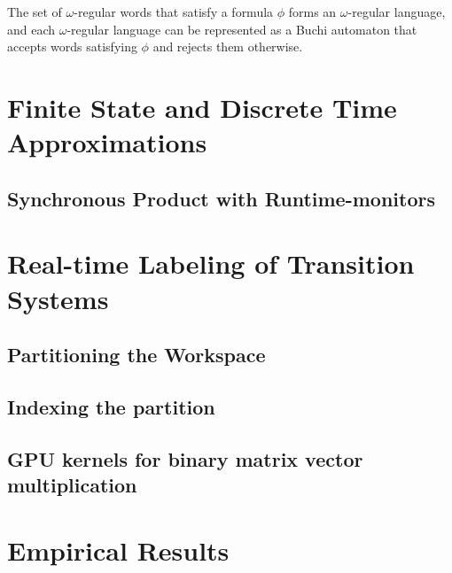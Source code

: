 \documentclass{llncs}
\begin{document}
The set of $\omega$-regular words that satisfy a formula $\phi$ forms an $\omega$-regular language, and each $\omega$-regular language can be represented as a Buchi automaton that accepts words satisfying $\phi$ and rejects them otherwise.
%


\section{\label{sec:approach}Finite State and Discrete Time Approximations}

\subsection{Synchronous Product with Runtime-monitors}
\section{\label{sec:Approach}Real-time Labeling of Transition Systems}
\subsection{Partitioning the Workspace}
\subsection{Indexing the partition}
\subsection{GPU kernels for binary matrix vector multiplication}

\section{\label{sec:experiments}Empirical Results}




\end{document}
